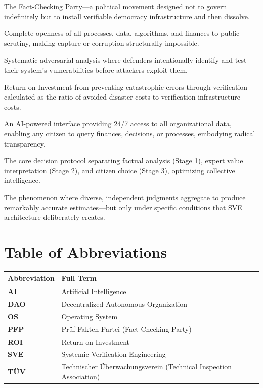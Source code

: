 \documentclass[11pt,a4paper]{article}
\begin{document}
\begin{description}[style=nextline, leftmargin=0pt, labelindent=0pt, font=\normalfont\bfseries]
    \item[PFP (Prüf-Fakten-Partei)] The Fact-Checking Party—a political movement designed not to govern indefinitely but to install verifiable democracy infrastructure and then dissolve.
    
    \item[Radical Transparency] Complete openness of all processes, data, algorithms, and finances to public scrutiny, making capture or corruption structurally impossible.
    
    \item[Red Teaming] Systematic adversarial analysis where defenders intentionally identify and test their system's vulnerabilities before attackers exploit them.
    
    \item[ROI of Truth] Return on Investment from preventing catastrophic errors through verification—calculated as the ratio of avoided disaster costs to verification infrastructure costs.
    
    \item[Socrates Bot] An AI-powered interface providing 24/7 access to all organizational data, enabling any citizen to query finances, decisions, or processes, embodying radical transparency.
    
    \item[Three-Stage Architecture] The core decision protocol separating factual analysis (Stage 1), expert value interpretation (Stage 2), and citizen choice (Stage 3), optimizing collective intelligence.
    
    \item[Wisdom of Crowds] The phenomenon where diverse, independent judgments aggregate to produce remarkably accurate estimates—but only under specific conditions that SVE architecture deliberately creates.
\end{description}

\section*{Table of Abbreviations}

\begin{tabular}{@{}>{\bfseries}ll@{}}
\toprule
\normalfont\textbf{Abbreviation} & \textbf{Full Term} \\
\midrule
AI & Artificial Intelligence \\
DAO & Decentralized Autonomous Organization \\
OS & Operating System \\
PFP & Prüf-Fakten-Partei (Fact-Checking Party) \\
ROI & Return on Investment \\
SVE & Systemic Verification Engineering \\
TÜV & Technischer Überwachungsverein (Technical Inspection Association) \\
\bottomrule
\end{tabular}
\end{document}
